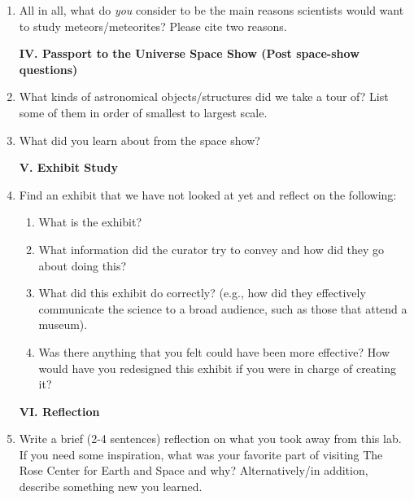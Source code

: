 \documentclass[12pt]{article}%
\begin{document}
\begin{flushleft}
\begin{enumerate}
\item All in all, what do \emph{you} consider to be the main reasons scientists
would want to study meteors/meteorites?  Please cite two reasons.

\vspace{0.3cm}

\begin{center}
\textbf{IV. Passport to the Universe Space Show (Post space-show questions)}
\end{center}

\item What kinds of astronomical objects/structures did we take a tour of? List some of them in order of smallest to largest scale.

\vspace{0.3cm}

\item What did you learn about from the space show? 

\vspace{0.3cm}

\begin{center}
\textbf{V. Exhibit Study}
\end{center}

\item Find an exhibit that we have not looked at yet and reflect on the following:
\begin{enumerate}[label = \alph*.]
\item What is the exhibit?
\item What information did the curator try to convey and how did they go about doing this?
\item What did this exhibit do correctly? (e.g., how did they effectively communicate the science to a broad audience, such as those that attend a museum).
\item Was there anything that you felt could have been more effective? How would have you redesigned this exhibit if you were in charge of creating it?
\end{enumerate}
\vspace{0.3cm}
\begin{center}
\textbf{VI. Reflection}
\end{center}


\item Write a brief (2-4 sentences) reflection on what you took away from this lab. If you need some inspiration, what was your favorite part of visiting The Rose Center for Earth and Space and why? Alternatively/in addition, describe something new you learned.

\end{enumerate}
\end{flushleft}
\end{document}
